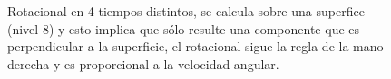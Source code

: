 \begin{figure}[!ht]
\centering
  \hfill{}\hfill
  \hfill

  \hfill{}\hfill
  \hfill
  \caption{Rotacional en 4 tiempos distintos, se calcula sobre una superfice (nivel 8) y esto implica que s\'olo resulte una componente que es perpendicular a la superficie, el rotacional sigue la regla de la mano derecha y es proporcional a la velocidad angular.}%
\label{fig:tres}
\end{figure}
